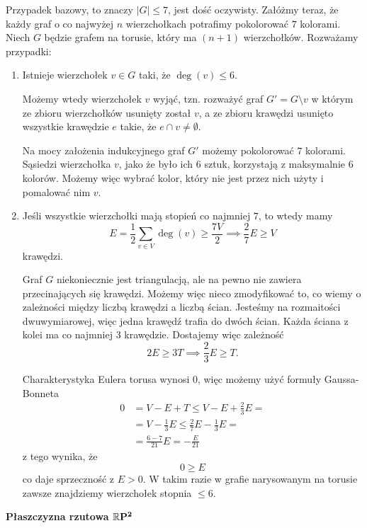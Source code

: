 \begin{enumerate}[label=\textbf{(\alph*)}]
    Przypadek bazowy, to znaczy $|G|\leq 7$, jest dość oczywisty. Załóżmy teraz, że każdy graf o co najwyżej $n$ wierzchołkach potrafimy pokolorować $7$ kolorami. Niech $G$ będzie grafem na torusie, który ma $(n+1)$ wierzchołków. Rozważamy przypadki:
    \begin{enumerate}[label=\arabic*.]
      \item Istnieje wierzchołek $v\in G$ taki, że $\deg(v)\leq6$.

        Możemy wtedy wierzchołek $v$ wyjąć, tzn. rozważyć graf $G'=G\setminus v$ w którym ze zbioru wierzchołków usunięty został $v$, a ze zbioru krawędzi usunięto wszystkie krawędzie $e$ takie, że $e\cap v\neq \emptyset$.

        Na mocy założenia indukcyjnego graf $G'$ możemy pokolorować $7$ kolorami. Sąsiedzi wierzchołka $v$, jako że było ich $6$ sztuk, korzystają z maksymalnie $6$ kolorów. Możemy więc wybrać kolor, który nie jest przez nich użyty i pomalować nim $v$.

      \item Jeśli wszystkie wierzchołki mają stopień co najmniej $7$, to wtedy mamy 
        $$E=\frac{1}{2}\sum_{v\in V}\deg(v)\geq \frac{7V}{2}\implies \frac{2}{7}E\geq V$$ 
        krawędzi. 

        Graf $G$ niekoniecznie jest triangulacją, ale na pewno nie zawiera przecinających się krawędzi. Możemy więc nieco zmodyfikować to, co wiemy o zależności między liczbą krawędzi a liczbą ścian. Jesteśmy na rozmaitości dwuwymiarowej, więc jedna krawędź trafia do dwóch ścian. Każda ściana z kolei ma co najmniej $3$ krawędzie. Dostajemy więc zależność
        $$2E\geq 3T\implies \frac{2}{3}E\geq T.$$

        Charakterystyka Eulera torusa wynosi $0$, więc możemy użyć formuły Gaussa-Bonneta
        \begin{align*}
          0&=V-E+T\leq V-E+\frac{2}{3}E=\\ 
                 &=V-\frac{1}{3}E\leq\frac{2}{7}E-\frac{1}{3}E=\\ 
                 &=\frac{6-7}{21}E=-\frac{E}{21}
        \end{align*}
        z tego wynika, że
        $$0\geq {E}$$
        co daje sprzeczność z $E>0$. W takim razie w grafie narysowanym na torusie zawsze znajdziemy wierzchołek stopnia $\leq 6$.
    \end{enumerate}

    \textbf{Płaszczyzna rzutowa $\boldsymbol{\operatorname{\mathbb{R}}}\mathbf{ P^2}$} \dotfill


\end{enumerate}
